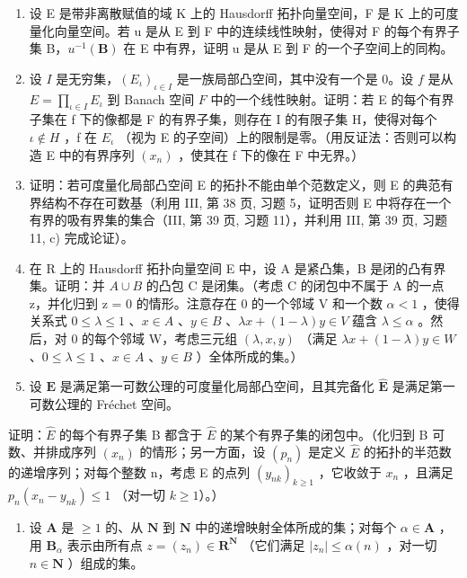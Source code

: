 \begin{enumerate}
\def\labelenumi{\arabic{enumi})}
\setcounter{enumi}{11}
\item
  设 E 是带非离散赋值的域 K 上的 Hausdorff 拓扑向量空间，F 是 K 上的可度量化向量空间。若 u 是从 E 到 F 中的连续线性映射，使得对 F 的每个有界子集 B，\(u^{-1}(\mathbf{B})\) 在 E 中有界，证明 u 是从 E 到 F 的一个子空间上的同构。
\item
  设 \(I\) 是无穷集，\((E_{\iota})_{\iota\in I}\) 是一族局部凸空间，其中没有一个是 0。设 \(f\) 是从 \(E = \prod_{\iota\in I}E_{\iota}\) 到 Banach 空间 \(F\) 中的一个线性映射。证明：若 E 的每个有界子集在 f 下的像都是 F 的有界子集，则存在 I 的有限子集 H，使得对每个 \(\iota \notin H\) ，f 在 \(E_{\iota}\) （视为 E 的子空间）上的限制是零。（用反证法：否则可以构造 E 中的有界序列 \((x_{n})\) ，使其在 f 下的像在 F 中无界。）
\item
  证明：若可度量化局部凸空间 E 的拓扑不能由单个范数定义，则 E 的典范有界结构不存在可数基（利用 III, 第 38 页, 习题 5，证明否则 E 中将存在一个有界的吸有界集的集合（III, 第 39 页, 习题 11），并利用 III, 第 39 页, 习题 11, c) 完成论证）。
\item
  在 R 上的 Hausdorff 拓扑向量空间 E 中，设 A 是紧凸集，B 是闭的凸有界集。证明：并 \(A \cup B\) 的凸包 C 是闭集。（考虑 C 的闭包中不属于 A 的一点 z，并化归到 z = 0 的情形。注意存在 0 的一个邻域 V 和一个数 \(\alpha < 1\) ，使得关系式 \(0 \leqslant \lambda \leqslant 1\) 、\(x \in A\) 、\(y \in B\) 、\(\lambda x + (1 - \lambda)y \in V\) 蕴含 \(\lambda \leqslant \alpha\) 。然后，对 0 的每个邻域 W，考虑三元组 \((\lambda, x, y)\) （满足 \(\lambda x + (1 - \lambda)y \in W\) 、\(0 \leqslant \lambda \leqslant 1\) 、\(x \in A\) 、\(y \in B\) ）全体所成的集。）
\item
  设 \(\mathbf{E}\) 是满足第一可数公理的可度量化局部凸空间，且其完备化 \(\hat{\mathbf{E}}\) 是满足第一可数公理的 Fréchet 空间。
\end{enumerate}

证明：\(\hat{E}\) 的每个有界子集 B 都含于 \(\hat{E}\) 的某个有界子集的闭包中。（化归到 B 可数、并排成序列 \((x_{n})\) 的情形；另一方面，设 \((p_{n})\) 是定义 \(\hat{E}\) 的拓扑的半范数的递增序列；对每个整数 n，考虑 E 的点列 \((y_{nk})_{k\geqslant1}\) ，它收敛于 \(x_{n}\) ，且满足 \(p_{n}(x_{n}-y_{nk})\leqslant1\) （对一切 \(k\geqslant1\)）。）

\begin{enumerate}
\def\labelenumi{\arabic{enumi})}
\setcounter{enumi}{16}
\tightlist
\item
  设 \(\mathbf{A}\) 是 \(\geqslant 1\) 的、从 \(\mathbf{N}\) 到 \(\mathbf{N}\) 中的递增映射全体所成的集；对每个 \(\alpha \in \mathbf{A}\) ，用 \(\mathbf{B}_{\alpha}\) 表示由所有点 \(z = (z_n) \in \mathbf{R}^{\mathbf{N}}\) （它们满足 \(|z_n| \leqslant \alpha(n)\) ，对一切 \(n \in \mathbf{N}\) ）组成的集。
\end{enumerate}

